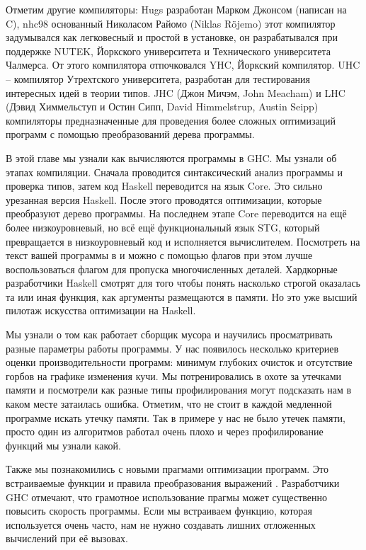 Отметим другие компиляторы: Hugs разработан Марком
Джонсом (написан на C), nhc98 основанный Николасом Райомо 
(Niklas Röjemo) этот компилятор задумывался как легковесный
и простой в установке, он разрабатывался при поддержке
NUTEK, Йоркского университета и Технического университета Чалмерса. 
От этого компилятора отпочковался YHC, Йоркский компилятор. 
UHC -- компилятор Утрехтского университета, разработан
для тестирования интересных идей в теории типов. 
JHC (Джон Мичэм,  John Meacham) и LHC 
(Дэвид Химмельступ и Остин Сипп, David Himmelstrup, Austin Seipp)
компиляторы предназначенные для проведения более
сложных оптимизаций программ с помощью преобразований
дерева программы.

В этой главе мы узнали как вычисляются программы в GHC.
Мы узнали об этапах компиляции. Сначала проводится
синтаксический анализ программы и проверка типов,
затем код Haskell переводится на язык Core. Это
сильно урезанная версия Haskell. После этого проводятся
оптимизации, которые преобразуют дерево программы.
На последнем этапе Core переводится на ещё более
низкоуровневый, но всё ещё функциональный язык STG,
который превращается в низкоуровневый код и исполняется
вычислителем. Посмотреть на текст вашей программы
в  и  можно с помощью флагов 
  при этом лучше воспользоваться
флагом  для пропуска многочисленных
деталей. Хардкорные разработчики Haskell смотрят 
для того чтобы понять насколько строгой оказалась та
или иная функция, как аргументы размещаются в памяти. 
Но это уже высший пилотаж искусства оптимизации на Haskell.

Мы узнали о том как работает сборщик мусора и научились
просматривать разные параметры работы программы. У нас 
появилось несколько критериев оценки производительности программ:
минимум глубоких очисток и отсутствие горбов на графике 
изменения кучи. Мы потренировались в охоте за утечками памяти
и посмотрели как разные типы профилирования могут подсказать
нам в каком месте затаилась ошибка. Отметим, что не стоит 
в каждой медленной программе искать утечку памяти. Так
в примере  у нас не было утечек памяти,
просто один из алгоритмов работал очень плохо и
через профилирование функций мы узнали какой. 

Также мы познакомились с новыми прагмами оптимизации
программ. Это встраиваемые функции  
и правила преобразования выражений . 
Разработчики GHC отмечают, что грамотное использование
прагмы  может существенно повысить 
скорость программы. Если мы встраиваем функцию, которая 
используется очень часто, нам не нужно создавать лишних
отложенных вычислений при её вызовах. 

